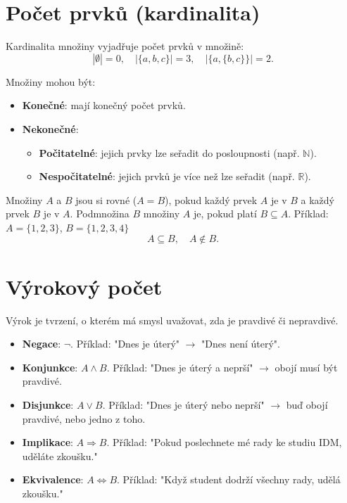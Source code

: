\documentclass{article}
\begin{document}
\section{Počet prvků (kardinalita)}
Kardinalita množiny vyjadřuje počet prvků v množině:
\[
|\emptyset| = 0, \quad |\{a, b, c\}| = 3, \quad |\{a, \{b, c\}\}| = 2.
\]

Množiny mohou být:
\begin{itemize}
    \item \textbf{Konečné}: mají konečný počet prvků.
    \item \textbf{Nekonečné}:
    \begin{itemize}
        \item \textbf{Počitatelné}: jejich prvky lze seřadit do posloupnosti (např. \(\mathbb{N}\)).
        \item \textbf{Nespočitatelné}: jejich prvků je více než lze seřadit (např. \(\mathbb{R}\)).
    \end{itemize}
\end{itemize}

Množiny \(A\) a \(B\) jsou si rovné (\(A = B\)), pokud každý prvek \(A\) je v \(B\) a každý prvek \(B\) je v \(A\).
Podmnožina \(B\) množiny \(A\) je, pokud platí \(B \subseteq A\).
Příklad:
\(A = \{1, 2, 3\}\), \(B = \{1, 2, 3, 4\}\)
\[
A \subseteq B, \quad A \notin B.
\]

\section{Výrokový počet}
Výrok je tvrzení, o kterém má smysl uvažovat, zda je pravdivé či nepravdivé.
\begin{itemize}
    \item \textbf{Negace}: \(\neg\).
    Příklad: "Dnes je úterý" \(\rightarrow\) "Dnes není úterý".
    \item \textbf{Konjunkce}: \(A \land B\).
    Příklad: "Dnes je úterý a neprší" \(\rightarrow\) obojí musí být pravdivé.
    \item \textbf{Disjunkce}: \(A \lor B\).
    Příklad: "Dnes je úterý nebo neprší" \(\rightarrow\) buď obojí pravdivé, nebo jedno z toho.
    \item \textbf{Implikace}: \(A \Rightarrow B\).
    Příklad: "Pokud poslechnete mé rady ke studiu IDM, uděláte zkoušku."
    \item \textbf{Ekvivalence}: \(A \Leftrightarrow B\).
    Příklad: "Když student dodrží všechny rady, udělá zkoušku."
\end{itemize}
\end{document}
